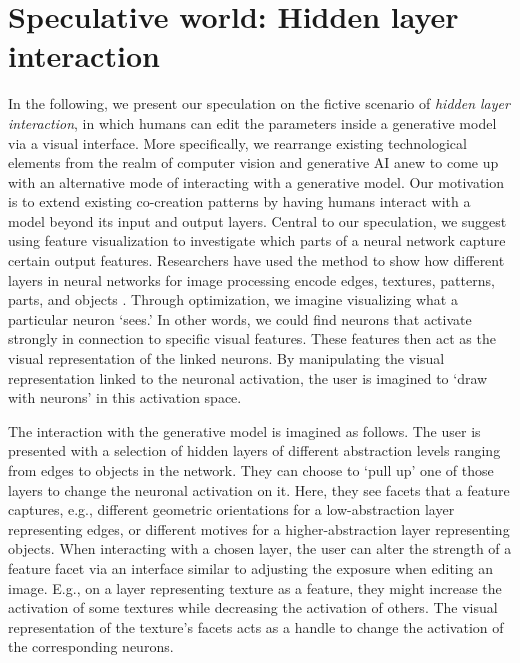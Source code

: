 \documentclass[manuscript]{acmart}
\begin{document}
\section{Speculative world: Hidden layer interaction}
In the following, we present our speculation on the fictive scenario of \textit{hidden layer interaction}, in which humans can edit the parameters inside a generative model via a visual interface. More specifically, we rearrange existing technological elements from the realm of computer vision and generative AI anew to come up with an alternative mode of interacting with a generative model.
%
Our motivation is to extend existing co-creation patterns by having humans interact with a model beyond its input and output layers. Central to our speculation, we suggest using feature visualization to investigate which parts of a neural network capture certain output features. Researchers have used the method to show how different layers in neural networks for image processing encode edges, textures, patterns, parts, and objects \cite{olah_feature_2017}.
Through optimization, we imagine visualizing what a particular neuron `sees.' In other words,
we could find neurons that activate strongly in connection to specific visual features.
These features then act as the visual representation of the linked neurons. By manipulating the visual representation linked to the neuronal activation, the user is imagined to `draw with neurons' in this activation space.

The interaction with the generative model is imagined as follows.
The user is presented with a selection of hidden layers of different abstraction levels ranging from edges to objects in the network.
They can choose to `pull up' one of those layers to change the neuronal activation on it.  
Here, they see facets that a feature captures, e.g., different geometric orientations for a low-abstraction layer representing edges, 
or different motives for a higher-abstraction layer representing objects.
When interacting with a chosen layer, the user can alter the strength of a feature facet via an interface similar to adjusting the exposure when editing an image. E.g., on a layer representing texture as a feature, they might increase the activation of some textures while decreasing the activation of others. The visual representation of the texture's facets acts as a handle to change the activation of the corresponding neurons.
\end{document}
